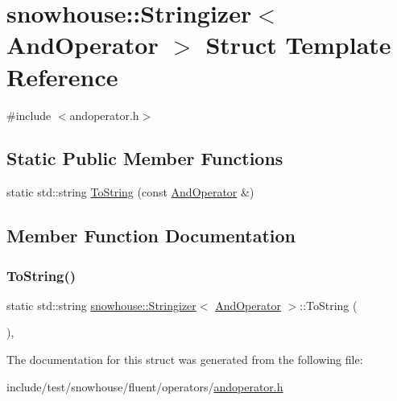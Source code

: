 \hypertarget{structsnowhouse_1_1Stringizer_3_01AndOperator_01_4}{}\section{snowhouse\+::Stringizer$<$ And\+Operator $>$ Struct Template Reference}
\label{structsnowhouse_1_1Stringizer_3_01AndOperator_01_4}


{\ttfamily \#include $<$andoperator.\+h$>$}

\subsection*{Static Public Member Functions}
\begin{DoxyCompactItemize}
\item 
static std\+::string \mbox{\hyperlink{structsnowhouse_1_1Stringizer_3_01AndOperator_01_4_ad306d667ecada9c875aef7af7650d97a}{To\+String}} (const \mbox{\hyperlink{structsnowhouse_1_1AndOperator}{And\+Operator}} \&)
\end{DoxyCompactItemize}


\subsection{Member Function Documentation}
\mbox{\label{structsnowhouse_1_1Stringizer_3_01AndOperator_01_4_ad306d667ecada9c875aef7af7650d97a}} 
\subsubsection{\texorpdfstring{ToString()}{ToString()}}
{\footnotesize\ttfamily static std\+::string \mbox{\hyperlink{structsnowhouse_1_1Stringizer}{snowhouse\+::\+Stringizer}}$<$ \mbox{\hyperlink{structsnowhouse_1_1AndOperator}{And\+Operator}} $>$\+::To\+String (\begin{DoxyParamCaption}\item[{const \mbox{\hyperlink{structsnowhouse_1_1AndOperator}{And\+Operator}} \&}]{ }\end{DoxyParamCaption})\hspace{0.3cm}{\ttfamily [inline]}, {\ttfamily [static]}}



The documentation for this struct was generated from the following file\+:\begin{DoxyCompactItemize}
\item 
include/test/snowhouse/fluent/operators/\mbox{\hyperlink{andoperator_8h}{andoperator.\+h}}\end{DoxyCompactItemize}
